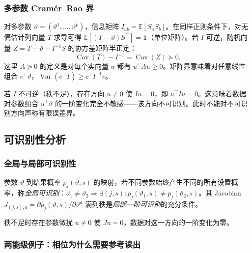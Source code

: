 \subsubsection{多参数 Cram\'er--Rao 界}

对多参数 $\vartheta=(\vartheta^1,\ldots,\vartheta^p)$，信息矩阵 $I_{ab}=\mathbb{E}[S_aS_b]$。在同样正则条件下，对无偏估计列向量 $T$ 求导可得 $\mathbb{E}[(T-\vartheta)S^\top]=\mathbf{1}$（单位矩阵）。若 $I$ 可逆，随机向量 $Z=T-\vartheta-I^{-1}S$ 的协方差矩阵半正定：
\begin{equation}
\operatorname{Cov}(T)-I^{-1}=\operatorname{Cov}(Z)\succeq 0.
\label{eq:feqo-cr-matrix}
\end{equation}
这里 $A\succeq 0$ 的定义是对每个实向量 $u$ 都有 $u^\top Au\geq 0$。矩阵界意味着对任意线性组合 $c^\top\vartheta$，$\operatorname{Var}(c^\top T)\geq c^\top I^{-1}c$。

\begin{note}[信息矩阵不可逆的含义]
若 $I$ 不可逆（秩不足），存在方向 $u\neq 0$ 使 $Iu=0$，即 $u^\top Iu=0$。这意味着数据对参数组合 $u^\top\vartheta$ 的一阶变化完全不敏感——该方向不可识别。此时不能对不可识别方向声称有限误差界。

\end{note}

\subsection{可识别性分析}

\subsubsection{全局与局部可识别性}

\begin{definition}[可识别性]
参数 $\vartheta$ 到结果概率 $p_j(\vartheta,s)$ 的映射，若不同参数始终产生不同的所有设置概率，称\emph{全局可识别}：$\vartheta_1\neq\vartheta_2\Rightarrow\exists(j,s):p_j(\vartheta_1,s)\neq p_j(\vartheta_2,s)$。其 Jacobian $J_{(j,s),a}=\partial p_j(\vartheta,s)/\partial\vartheta^a$ 满列秩是\emph{局部一阶可识别}的充分条件。
\end{definition}

秩不足时存在参数微扰 $u\neq 0$ 使 $Ju=0$，数据对这一方向的一阶变化为零。

\subsubsection{两能级例子：相位为什么需要参考读出}

